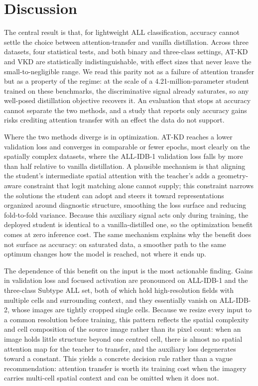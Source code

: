 \documentclass[preprint,review,12pt]{elsarticle}
\begin{document}
\section{Discussion}

The central result is that, for lightweight ALL classification, accuracy
cannot settle the choice between attention-transfer and vanilla
distillation. Across three datasets, four statistical tests, and both
binary and three-class settings, AT-KD and VKD are statistically
indistinguishable, with effect sizes that never leave the
small-to-negligible range. We read this parity not as a failure of
attention transfer but as a property of the regime: at the scale of a
4.21-million-parameter student trained on these benchmarks, the
discriminative signal already saturates, so any well-posed distillation
objective recovers it. An evaluation that stops at accuracy cannot
separate the two methods, and a study that reports only accuracy gains
risks crediting attention transfer with an effect the data do not
support.

Where the two methods diverge is in optimization. AT-KD reaches a lower
validation loss and converges in comparable or fewer epochs, most clearly
on the spatially complex datasets, where the ALL-IDB-1 validation loss
falls by more than half relative to vanilla distillation. A plausible
mechanism is that aligning the student's intermediate spatial attention
with the teacher's adds a geometry-aware constraint that logit matching
alone cannot supply; this constraint narrows the solutions the student
can adopt and steers it toward representations organized around
diagnostic structure, smoothing the loss surface and reducing
fold-to-fold variance. Because this auxiliary signal acts only during
training, the deployed student is identical to a vanilla-distilled one, so
the optimization benefit comes at zero inference cost. The same mechanism
explains why the benefit does not surface as accuracy: on saturated data,
a smoother path to the same optimum changes how the model is reached, not
where it ends up.

The dependence of this benefit on the input is the most actionable
finding. Gains in validation loss and focused activation are pronounced on
ALL-IDB-1 and the three-class Subtype ALL set, both of which hold
high-resolution fields with multiple cells and surrounding context, and
they essentially vanish on ALL-IDB-2, whose images are tightly cropped
single cells. Because we resize every input to a common resolution before
training, this pattern reflects the spatial complexity and cell
composition of the source image rather than its pixel count: when an
image holds little structure beyond one centred cell, there is almost no
spatial attention map for the teacher to transfer, and the auxiliary loss
degenerates toward a constant. This yields a concrete decision rule
rather than a vague recommendation: attention transfer is worth its
training cost when the imagery carries multi-cell spatial context and can
be omitted when it does not.
\end{document}

